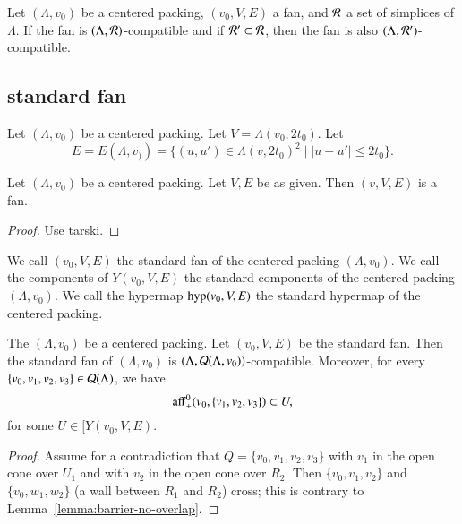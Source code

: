 \begin{lemma}
Let $(\Lambda,v_0)$ be a centered packing, $(v_0,V,E)$ a fan, and ${\mathcal R}$ a set of simplices of $\Lambda$.
If the fan is $(\Lambda,{\mathcal R})$-compatible and if
 ${\mathcal R}'\subset{\mathcal R}$, then the fan is also $(\Lambda,{\mathcal R}')$-compatible.
\end{lemma}

\subsection{standard fan}

Let $(\Lambda,v_0)$ be a centered packing.  
Let $V=\Lambda(v_0,2t_0)$.
Let 
$$E = E(\Lambda,v_)) = \{(u,u')\in \Lambda(v,2t_0)^2 \mid |u-u'|\le 2t_0\}.
$$


\begin{lemma}
Let $(\Lambda,v_0)$ be a centered packing.  Let $V,E$ be as given.
Then $(v,V,E)$ is a fan.
\end{lemma}

\begin{proof}
Use tarski.
\end{proof}

\begin{definition}  
We call $(v_0,V,E)$ the standard
fan of the centered packing $(\Lambda,v_0)$.   We call the
components of $Y(v_0,V,E)$ the standard components of the centered
packing $(\Lambda,v_0)$.  We call the hypermap ${\operatorname{hyp}}(v_0,V,E)$
the standard hypermap of the centered packing.  
\end{definition}

\begin{lemma}
The $(\Lambda,v_0)$ be a centered packing.  Let $(v_0,V,E)$ be the
standard fan.  Then the standard fan of $(\Lambda,v_0)$ is
$(\Lambda,{\mathcal Q}(\Lambda,v_0))$-compatible. Moreover,
for every $\{v_0,v_1,v_2,v_3\}\in{\mathcal Q}(\Lambda)$, we have
$$
 {\operatorname{aff}}_+^0(v_0,\{v_1,v_2,v_3\})\subset U,
$$
for some $U\in[Y(v_0,V,E)$.
\end{lemma}


\begin{proof}  Assume for a contradiction that $Q=\{v_0,v_1,v_2,v_3\}$
with $v_1$ in the open cone over $U_1$ and with $v_2$ in the open
cone over $R_2$.  Then $\{v_0,v_1,v_2\}$ and $\{v_0,w_1,w_2\}$ (a wall
between $R_1$ and $R_2$) cross;  this is contrary to
Lemma~\ref{lemma:barrier-no-overlap}.
\end{proof}


